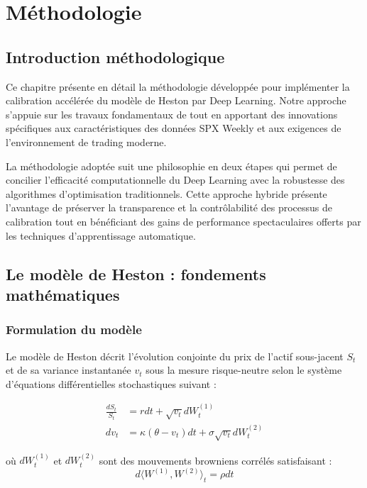 \chapter{Méthodologie}

\section{Introduction méthodologique}

Ce chapitre présente en détail la méthodologie développée pour implémenter la calibration accélérée du modèle de Heston par Deep Learning. Notre approche s'appuie sur les travaux fondamentaux de \citet{bayer2018deep} tout en apportant des innovations spécifiques aux caractéristiques des données SPX Weekly et aux exigences de l'environnement de trading moderne.

La méthodologie adoptée suit une philosophie en deux étapes qui permet de concilier l'efficacité computationnelle du Deep Learning avec la robustesse des algorithmes d'optimisation traditionnels. Cette approche hybride présente l'avantage de préserver la transparence et la contrôlabilité des processus de calibration tout en bénéficiant des gains de performance spectaculaires offerts par les techniques d'apprentissage automatique.

\section{Le modèle de Heston : fondements mathématiques}

\subsection{Formulation du modèle}

Le modèle de Heston \citep{heston1993closed} décrit l'évolution conjointe du prix de l'actif sous-jacent $S_t$ et de sa variance instantanée $v_t$ sous la mesure risque-neutre selon le système d'équations différentielles stochastiques suivant :

\begin{align}
\frac{dS_t}{S_t} &= r dt + \sqrt{v_t} dW_t^{(1)} \label{eq:heston_price}\\
dv_t &= \kappa(\theta - v_t)dt + \sigma\sqrt{v_t}dW_t^{(2)} \label{eq:heston_variance}
\end{align}

où $dW_t^{(1)}$ et $dW_t^{(2)}$ sont des mouvements browniens corrélés satisfaisant :
\begin{equation}
d\langle W^{(1)}, W^{(2)} \rangle_t = \rho dt
\end{equation}


